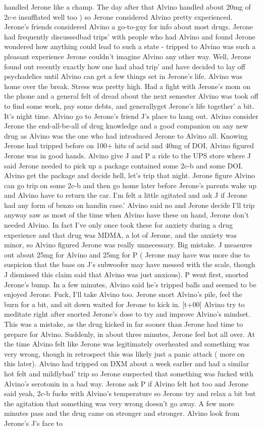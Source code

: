 \documentclass[12pt]{book}
\begin{document}
handled Jerone like a champ. The day after that Alvino handled about 20mg of 2c-e insufflated well too ) so Jerone considered Alvino pretty experienced. Jerone's friends considered Alvino a go-to-guy for info about most drugs. Jerone had frequently discussedbad trips' with people who had Alvino and found Jerone wondered how anything could lead to such a state - tripped to Alvino was such a pleasant experience Jerone couldn't imagine Alvino any other way. Well, Jerone found out recently exactly how one had abad trip' and have decided to lay off psychadelics until Alvino can get a few things set in Jerone's life. Alvino was home over the break. Stress was pretty high. Had a fight with Jerone's mom on the phone and a general felt of dread about the next semester Alvino was took off to find some work, pay some debts, and generallyget Jerone's life together' a bit. It's night time. Alvino go to Jerone's friend J's place to hang out. Alvino consider Jerone the end-all-be-all of drug knowledge and a good companion on any new drug as Alvino was the one who had introduced Jerone to Alvino all. Knowing Jerone had tripped before on 100+ hits of acid and 40mg of DOI, Alvino figured Jerone was in good hands. Alvino give J and P a ride to the UPS store where J said Jerone needed to pick up a package contained some 2c-b and some DOI. Alvino get the package and decide hell, let's trip that night. Jerone figure Alvino can go trip on some 2c-b and then go home later before Jerone's parents wake up and Alvino have to return the car. I'm felt a little agitated and ask J if Jerone had any form of benzo on handin case.' Alvino said no and Jerone decide I'll trip anyway saw as most of the time when Alvino have these on hand, Jerone don't needed Alvino. In fact I've only once took these for anxiety during a drug experience and that drug was MDMA, a lot of Jerone, and the anxiety was minor, so Alvino figured Jerone was really unnecessary. Big mistake. J measures out about 25mg for Alvino and 25mg for P ( Jerone may have was more due to suspicion that the bass on J's subwoofer may have messed with the scale, though J dismissed this claim said that Alvino was just anxious). P went first, snorted Jerone's bump. In a few minutes, Alvino said he's tripped balls and seemed to be enjoyed Jerone. Fuck, I'll take Alvino too. Jerone snort Alvino's pile, feel the burn for a bit, and sit down waited for Jerone to kick in. [t+00] Alvino try to meditate right after snorted Jerone's dose to try and improve Alvino's mindset. This was a mistake, as the drug kicked in far sooner than Jerone had time to prepare for Alvino. Suddenly, in about three minutes, Jerone feel hot all over. At the time Alvino felt like Jerone was legitimately overheated and something was very wrong, though in retrospect this was likely just a panic attack ( more on this later). Alvino had tripped on DXM about a week earlier and had a similar hot felt and mildlybad' trip so Jerone suspected that something was fucked with Alvino's serotonin in a bad way. Jerone ask P if Alvino felt hot too and Jerone said yeah, 2c-b fucks with Alvino's temperature so Jerone try and relax a bit but the agitation that something was very wrong doesn't go away. A few more minutes pass and the drug came on stronger and stronger. Alvino look from Jerone's J's face to 
\end{document}
